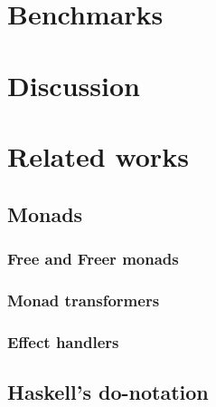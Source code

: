 \section{Benchmarks}\label{Benchmarks}

\section{Discussion}










\section{Related works}

\subsection{Monads}\label{Monads}

\subsubsection{Free and Freer monads}\label{Effect handlers}

\subsubsection{Monad transformers}\label{Monad transformers}

\subsubsection{Effect handlers}\label{Effect handlers}

\subsection{Haskell's do-notation}

